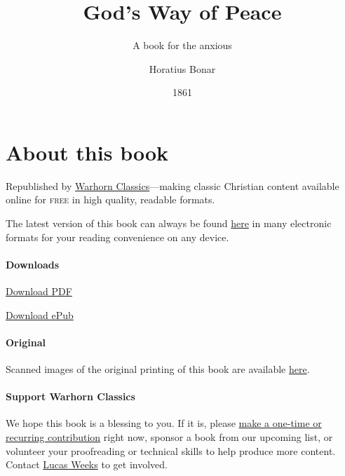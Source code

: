 \documentclass[
]{book}
\title{God's Way of Peace}
\subtitle{A book for the anxious}
\author{Horatius Bonar}
\date{1861}
\begin{document}
\maketitle

\mainmatter
{}

{
\setcounter{tocdepth}{1}
\tableofcontents
}
\hypertarget{about-this-book}{%
\chapter*{About this book}\label{about-this-book}}

Republished by \href{https://classics.warhornmedia.com/}{Warhorn Classics}---making classic Christian content available online for \textsc{free} in high quality, readable formats.

The latest version of this book can always be found \href{https://warhornmedia.github.io/bonar-peace/}{here} in many electronic formats for your reading convenience on any device.

\hypertarget{downloads}{%
\subsubsection*{Downloads}\label{downloads}}

\href{https://warhornmedia.github.io/bonar-peace//Bonar-Peace.pdf}{Download PDF}

\href{https://warhornmedia.github.io/bonar-peace//Bonar-Peace.epub}{Download ePub}

\hypertarget{original}{%
\subsubsection*{Original}\label{original}}

Scanned images of the original printing of this book are available \href{https://archive.org/details/godswayofpeacebo00bona/page/n5/mode/2up}{here}.

\hypertarget{support-warhorn-classics}{%
\subsubsection*{Support Warhorn Classics}\label{support-warhorn-classics}}

We hope this book is a blessing to you. If it is, please \href{https://warhornmedia.com/give}{make a one-time or recurring contribution} right now, sponsor a book from our upcoming list, or volunteer your proofreading or technical skills to help produce more content. Contact \href{mailto:lucas@beggarsborn.com}{Lucas Weeks} to get involved.
\end{document}
